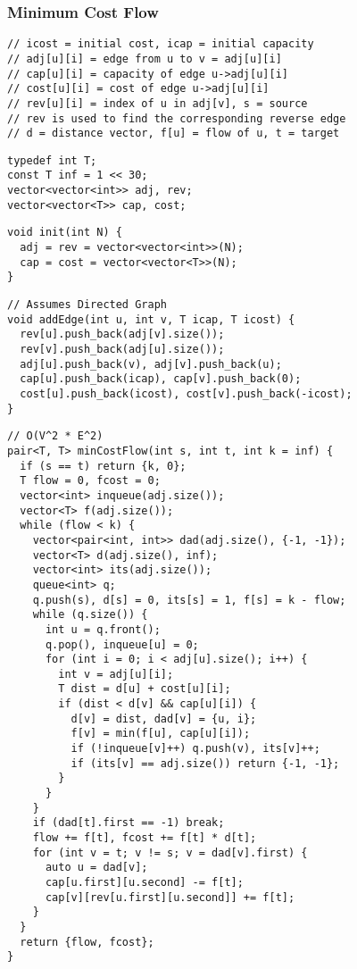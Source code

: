\documentclass[twoside]{article}
\begin{document}
\begin{multicols*}{2}
\subsubsection*{Minimum Cost Flow}
\begin{verbatim}
// icost = initial cost, icap = initial capacity
// adj[u][i] = edge from u to v = adj[u][i]
// cap[u][i] = capacity of edge u->adj[u][i]
// cost[u][i] = cost of edge u->adj[u][i]
// rev[u][i] = index of u in adj[v], s = source
// rev is used to find the corresponding reverse edge
// d = distance vector, f[u] = flow of u, t = target
\end{verbatim}
\vspace{-12pt}
\begin{verbatim}
typedef int T;
const T inf = 1 << 30;
vector<vector<int>> adj, rev;
vector<vector<T>> cap, cost;
\end{verbatim}
\vspace{-12pt}
\begin{verbatim}
void init(int N) {
  adj = rev = vector<vector<int>>(N);
  cap = cost = vector<vector<T>>(N);
}
\end{verbatim}
\vspace{-12pt}
\begin{verbatim}
// Assumes Directed Graph
void addEdge(int u, int v, T icap, T icost) {
  rev[u].push_back(adj[v].size());
  rev[v].push_back(adj[u].size());
  adj[u].push_back(v), adj[v].push_back(u);
  cap[u].push_back(icap), cap[v].push_back(0);
  cost[u].push_back(icost), cost[v].push_back(-icost);
}
\end{verbatim}
\vspace{-12pt}
\begin{verbatim}
// O(V^2 * E^2)
pair<T, T> minCostFlow(int s, int t, int k = inf) {
  if (s == t) return {k, 0};
  T flow = 0, fcost = 0;
  vector<int> inqueue(adj.size());
  vector<T> f(adj.size());
  while (flow < k) {
    vector<pair<int, int>> dad(adj.size(), {-1, -1});
    vector<T> d(adj.size(), inf);
    vector<int> its(adj.size());
    queue<int> q;
    q.push(s), d[s] = 0, its[s] = 1, f[s] = k - flow;
    while (q.size()) {
      int u = q.front();
      q.pop(), inqueue[u] = 0;
      for (int i = 0; i < adj[u].size(); i++) {
        int v = adj[u][i];
        T dist = d[u] + cost[u][i];
        if (dist < d[v] && cap[u][i]) {
          d[v] = dist, dad[v] = {u, i};
          f[v] = min(f[u], cap[u][i]);
          if (!inqueue[v]++) q.push(v), its[v]++;
          if (its[v] == adj.size()) return {-1, -1};
        }
      }
    }
    if (dad[t].first == -1) break;
    flow += f[t], fcost += f[t] * d[t];
    for (int v = t; v != s; v = dad[v].first) {
      auto u = dad[v];
      cap[u.first][u.second] -= f[t];
      cap[v][rev[u.first][u.second]] += f[t];
    }
  }
  return {flow, fcost};
}
\end{verbatim}


\end{multicols*}
\end{document}
